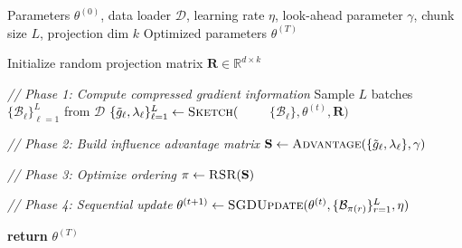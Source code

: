 \begin{algorithm}
\caption{The Overall Pipeline of $D^3$}
\label{alg:d3}
\begin{algorithmic}[1]
\REQUIRE Parameters $\theta^{(0)}$, data loader $\mathcal{D}$, learning rate $\eta$, look-ahead parameter $\gamma$, chunk size $L$, projection dim $k$
\ENSURE Optimized parameters $\theta^{(T)}$

\STATE Initialize random projection matrix $\mathbf{R} \in \mathbb{R}^{d \times k}$

    \item[] \textit{// Phase 1: Compute compressed gradient information}
    \STATE Sample $L$ batches $\{\mathcal{B}_\ell\}_{\ell=1}^L$ from $\mathcal{D}$
\STATE $\{\tilde{g}_\ell, \lambda_\ell\}_{\ell=1}^L \gets 
      \textsc{Sketch}($
\STATE $\qquad \{\mathcal{B}_\ell\}, \theta^{(t)}, \mathbf{R})$
    \item[] \textit{// Phase 2: Build influence advantage matrix}
    \STATE $\mathbf{S} \gets \textsc{Advantage}(\{\tilde{g}_\ell, \lambda_\ell\}, \gamma)$
    
    \item[] \textit{// Phase 3: Optimize ordering}
    \STATE $\pi \gets \textsc{RSR}(\mathbf{S})$
    
    \item[] \textit{// Phase 4: Sequential update}
    \STATE $\theta^{(t+1)} \gets \textsc{SGDUpdate}(\theta^{(t)}, \{\mathcal{B}_{\pi(r)}\}_{r=1}^L, \eta)$
\ENDFOR

\STATE \textbf{return} $\theta^{(T)}$
\end{algorithmic}
\end{algorithm}


